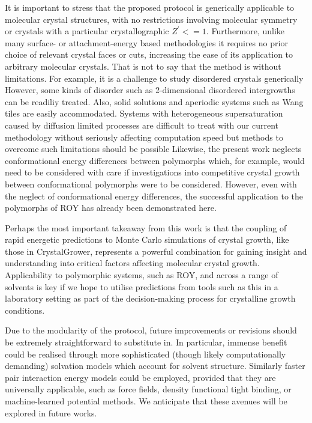\documentclass[twoside,twocolumn,9pt]{article}
\begin{document}
It is important to stress that the proposed protocol is generically applicable to molecular crystal structures, with no restrictions involving molecular symmetry or crystals with a particular crystallographic $Z^\prime <= 1$. Furthermore, unlike many surface- or attachment-energy based methodologies it requires no prior choice of relevant crystal faces or cuts,
increasing the ease of its application to arbitrary molecular crystals. That is not to say that the method is without limitations. For example, it is a challenge to study disordered crystals generically However, some kinds of disorder such as 2-dimensional disordered intergrowths can be readiliy treated\cite{Trueman2022}. Also, solid solutions and aperiodic systems such as Wang tiles are easily accommodated. Systems with heterogeneous supersaturation caused by diffusion limited processes are difficult to treat with our current methodology without seriously affecting computation speed but methods to overcome such limitations should be possible 
Likewise, the present work neglects conformational energy differences between polymorphs which, for example, would need to be considered with care if investigations into
competitive crystal growth between conformational polymorphs were to be considered. However, even with the neglect of conformational energy differences, the successful application to the polymorphs
of ROY has already been demonstrated here.


Perhaps the most important takeaway from this work is that the coupling of rapid energetic predictions to Monte Carlo simulations of crystal growth, like those in CrystalGrower, represents a powerful combination for gaining insight and understanding into critical factors affecting molecular crystal growth. Applicability to polymorphic systems, such as ROY, and across a range of solvents is key if we hope to utilise predictions from tools such as this in a laboratory setting as part of the decision-making process for crystalline growth conditions.

Due to the modularity of the protocol, future improvements or revisions should be extremely straightforward to substitute in. 
In particular, immense benefit could be realised through more sophisticated (though likely computationally demanding) solvation models which account for solvent structure. Similarly faster pair interaction energy models could be employed, provided that they are universally applicable, such as force fields,\cite{Spicher2020,Gale2021} density functional tight binding,\cite{Bannwarth2019} or machine-learned potential methods. We anticipate that these avenues will be explored in future works.
\end{document}
